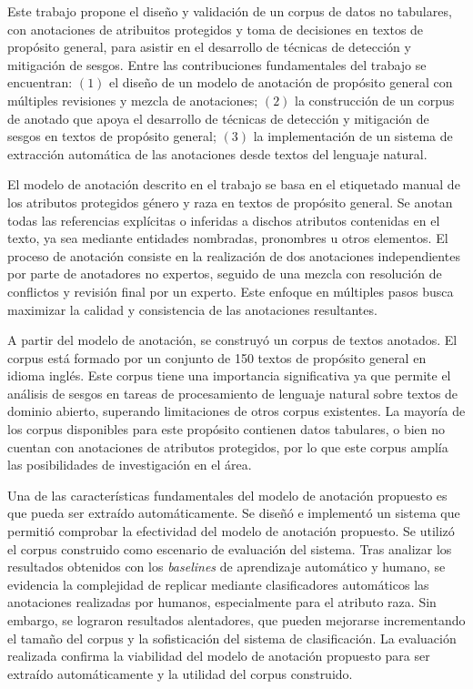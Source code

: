 \begin{conclusions}
    Este trabajo propone el dise\~no y validaci\'on de un corpus de datos no tabulares, con anotaciones de atribuitos
    protegidos y toma de decisiones en textos de prop\'osito general, para asistir en el desarrollo de t\'ecnicas de 
    detecci\'on y mitigaci\'on de sesgos. Entre las contribuciones fundamentales del trabajo se encuentran: $(1)$ el 
    dise\~no de un modelo de anotaci\'on de prop\'osito general con m\'ultiples revisiones y mezcla de anotaciones;
    $(2)$ la construcci\'on de un corpus de anotado que apoya el desarrollo de t\'ecnicas de detecci\'on y mitigaci\'on
    de sesgos en textos de prop\'osito general; $(3)$ la implementaci\'on de un sistema de extracci\'on autom\'atica 
    de las anotaciones desde textos del lenguaje natural.

    El modelo de anotaci\'on descrito en el trabajo se basa en el etiquetado manual de los atributos protegidos g\'enero 
    y raza en textos de prop\'osito general. Se anotan todas las referencias expl\'icitas o inferidas a dischos 
    atributos contenidas en el texto, ya sea mediante entidades nombradas, pronombres u otros elementos. El proceso
    de anotaci\'on consiste en la realizaci\'on de dos anotaciones independientes por parte de anotadores no expertos,
    seguido de una mezcla con resoluci\'on de conflictos y revisi\'on final por un experto. Este enfoque en m\'ultiples 
    pasos busca maximizar la calidad y consistencia de las anotaciones resultantes.

    A partir del modelo de anotaci\'on, se construy\'o un corpus de textos anotados. El corpus est\'a formado por un 
    conjunto de 150 textos de prop\'osito general en idioma ingl\'es. Este corpus tiene una importancia significativa
    ya que permite el an\'alisis de sesgos en tareas de procesamiento de lenguaje natural sobre textos de dominio abierto, 
    superando limitaciones de otros corpus existentes. La mayor\'ia de los corpus disponibles para este prop\'osito
    contienen datos tabulares, o bien no cuentan con anotaciones de atributos protegidos, por lo que este corpus 
    ampl\'ia las posibilidades de investigaci\'on en el \'area.
    
    Una de las caracter\'isticas fundamentales del modelo de anotaci\'on propuesto es que pueda ser extra\'ido 
    autom\'aticamente. Se dise\~n\'o e implement\'o un sistema que permiti\'o comprobar la efectividad del modelo 
    de anotaci\'on propuesto. Se utiliz\'o el corpus construido como escenario de evaluaci\'on del sistema. 
    Tras analizar los resultados obtenidos con los \emph{baselines} de aprendizaje autom\'atico y humano, se 
    evidencia la complejidad de replicar mediante clasificadores autom\'aticos las anotaciones realizadas por 
    humanos, especialmente para el atributo raza. Sin embargo, se lograron resultados alentadores, que pueden 
    mejorarse incrementando el tama\~no del corpus y la sofisticaci\'on del sistema de clasificaci\'on. La 
    evaluaci\'on realizada confirma la viabilidad del modelo de anotaci\'on propuesto para ser extra\'ido 
    autom\'aticamente y la utilidad del corpus construido.


\end{conclusions}
